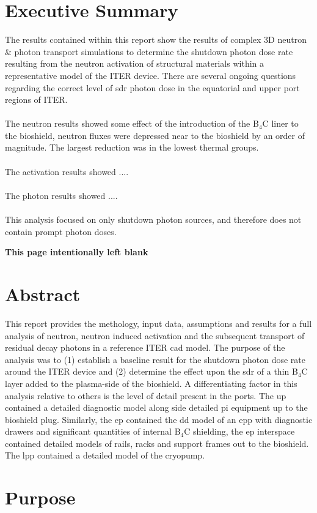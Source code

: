\documentclass[12pt]{article}
\newcommand*{\blankpage}{%
\vspace*{\fill}
\begin{center}
 \centering \textbf{This page intentionally left blank}
\end{center}
\vspace{\fill}}
\begin{document}
\section*{Executive Summary}
The results contained within this report show the results of complex 3D neutron
\& photon transport simulations to determine the shutdown photon dose rate
resulting from the neutron activation of structural materials within a
representative model of the ITER device. There are several ongoing questions
regarding the correct level of \gls{sdr} photon dose in the equatorial and upper
port regions of ITER.
\\
\\
The neutron results showed some effect of the introduction of the B$_4$C liner 
to the bioshield, neutron fluxes were depressed near to the bioshield by an 
order of magnitude. The largest reduction was in the lowest thermal groups.
\\
\\
The activation results showed ....
\\
\\
The photon results showed ....
\\
\\
This analysis focused on only shutdown photon sources, and therefore does not
contain prompt photon doses.
\newpage
\blankpage
\newpage
\section*{Abstract}
This report provides the methology, input data, assumptions and results for a
full analysis of neutron, neutron induced activation and the subsequent
transport of residual decay photons in a reference ITER \gls{cad} model. The purpose
of the analysis was to (1) establish a baseline result for the shutdown photon
dose rate around the ITER device and (2) determine the effect upon the \gls{sdr} of a
thin B$_4$C layer added to the plasma-side of the bioshield. A differentiating
factor in this analysis relative to others is the level of detail present in
the ports. The \gls{up} contained a detailed diagnostic model along side detailed \gls{pi}
equipment up to the bioshield plug. Similarly, the \gls{ep} contained the \gls{dd} model of
an \gls{epp} with diagnostic drawers and significant quantities of internal B$_4$C
shielding, the \gls{ep} interspace contained detailed models of rails, racks and
support frames out to the bioshield. The \gls{lpp} contained a detailed model of the
cryopump. 
\newpage
\section{Purpose}
\end{document}

